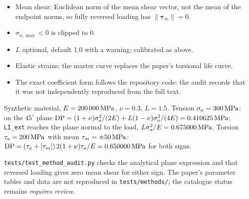 \begin{itemize}
\item Mean shear: Euclidean norm of the mean shear vector, not the mean of the endpoint norms, so
  fully reversed loading has $\lVert\boldsymbol\tau_m\rVert=0$.
\item $\sigma_{n,\max}<0$ is clipped to $0$.
\item $L$ optional, default 1.0 with a warning; calibrated as above.
\item Elastic strains; the master curve replaces the paper's torsional life curve.
\item The exact coefficient form follows the repository code: the audit records that it was not
  independently reproduced from the full text.
\end{itemize}

 Synthetic material, $E=200\,000\,\mathrm{MPa}$, $\nu=0.3$, $L=1.5$. Tension
$\sigma_a=300\,\mathrm{MPa}$: on the $45^\circ$ plane
$\mathrm{DP}=(1+\nu)\sigma_a^2/(2E)+L(1-\nu)\sigma_a^2/(4E)=0.410625\,\mathrm{MPa}$; \texttt{LI\_ext} reaches
the plane normal to the load, $L\sigma_a^2/E=0.675000\,\mathrm{MPa}$. Torsion $\tau_a=200\,\mathrm{MPa}$ with mean
$\tau_m=\pm50\,\mathrm{MPa}$: $\mathrm{DP}=(\tau_a+\lvert\tau_m\rvert)\,2(1+\nu)\tau_a/E=0.650000\,\mathrm{MPa}$ for both
signs.

 \texttt{tests/test\_method\_audit.py} checks the analytical plane expression
and that reversed loading gives zero mean shear for either sign. The paper's parameter tables and
data are not reproduced in \texttt{tests/methods/}; the catalogue status remains
\emph{requires review}.
